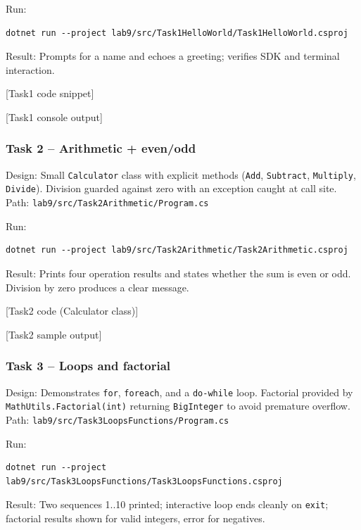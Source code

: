 Run:
\begin{verbatim}
dotnet run --project lab9/src/Task1HelloWorld/Task1HelloWorld.csproj
\end{verbatim}

Result: Prompts for a name and echoes a greeting; verifies SDK and terminal interaction.

[Task1 code snippet]

[Task1 console output]

\subsubsection{Task 2 -- Arithmetic + even/odd}
Design: Small \texttt{Calculator} class with explicit methods (\texttt{Add}, \texttt{Subtract}, \texttt{Multiply}, \texttt{Divide}). Division guarded against zero with an exception caught at call site.\\
Path: \texttt{lab9/src/Task2Arithmetic/Program.cs}

Run:
\begin{verbatim}
dotnet run --project lab9/src/Task2Arithmetic/Task2Arithmetic.csproj
\end{verbatim}

Result: Prints four operation results and states whether the sum is even or odd. Division by zero produces a clear message.

[Task2 code (Calculator class)]

[Task2 sample output]

\subsubsection{Task 3 -- Loops and factorial}
Design: Demonstrates \texttt{for}, \texttt{foreach}, and a \texttt{do-while} loop. Factorial provided by \texttt{MathUtils.Factorial(int)} returning \texttt{BigInteger} to avoid premature overflow.\\
Path: \texttt{lab9/src/Task3LoopsFunctions/Program.cs}

Run:
\begin{verbatim}
dotnet run --project lab9/src/Task3LoopsFunctions/Task3LoopsFunctions.csproj
\end{verbatim}

Result: Two sequences 1..10 printed; interactive loop ends cleanly on \texttt{exit}; factorial results shown for valid integers, error for negatives.

